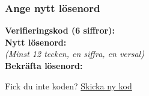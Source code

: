 \documentclass[10pt]{beamer}
\begin{document}
\begin{frame}[label=resetpassword]
  \frametitle{Ange nytt lösenord}

  \vspace{0.5cm}
  \begin{minipage}{0.9\textwidth}
    \small
    \textbf{Verifieringskod (6 siffror):} \underline{\hspace{6.5cm}} \\
    \vspace{0.5cm}
    \textbf{Nytt lösenord:} \underline{\hspace{6.5cm}} \\
    \footnotesize\textit{(Minst 12 tecken, en siffra, en versal)} \\
    \vspace{0.3cm}
    \textbf{Bekräfta lösenord:} \underline{\hspace{6.5cm}} \\

    \vspace{1cm}
    \centering

    \vspace{1cm}
    \footnotesize
    Fick du inte koden? \hyperlink{forgotpassword}{\textcolor{terracotta}{Skicka ny kod}}
  \end{minipage}
\end{frame}


%
%
%
%
%
%
\end{document}
